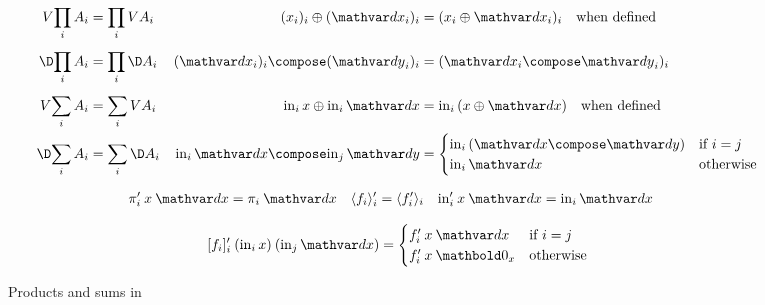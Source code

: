 \begin{figure}
  \begin{align*}
    \vals{\prod_{i} A_i} &= \prod_{i} \vals A_i &
    (x_i)_i \upd (\dx_i)_i &= (x_i \upd \dx_i)_i
    \quad\text{when defined}
    \\[1ex]
    \chgs{\prod_{i} A_i} &= \prod_{i} \chgs A_i &
    (\dx_i)_i \compose (\dy_i)_i &= (\dx_i \compose \dy_i)_i
    \\[1ex]
    \vals{\sum_{i} A_i} &= \sum_{i} \vals A_i &
    \inj i x \upd \inj i \dx &= \inj i (x \upd \dx) \quad\text{when defined}
    \\
    \chgs{\sum_{i} A_i} &= \sum_{i} \chgs A_i &
    \inj i \dx \compose \inj j \dy &= 
    \begin{cases}
      \inj i (\dx \compose \dy) & \text{if}~i=j\\
      \inj i \dx & \text{otherwise}
    \end{cases}
  \end{align*}

  \begin{align*}
    \deriv\pi_i \<x \<\dx &= \pi_i\<\dx &
    \deriv{\fork{f_i}_i} &= \fork{\deriv f_i}_i &
    \deriv\injc_i \<x \<\dx &= \inj i \dx
  \end{align*}

  \begin{equation*}
    \deriv{\krof{f_i}_i} \<(\inj i x) \<(\inj j \dx)
    =
    \begin{cases}
      \deriv f_i \<x \<\dx & \text{if}~i = j\\
      \deriv f_i \<x \<\zero_x & \text{otherwise}
    \end{cases}
  \end{equation*}
  \vspace{-1em}

  \caption{Products and sums in \CP}
  \label{fig:CP-cartesian}
\end{figure}
